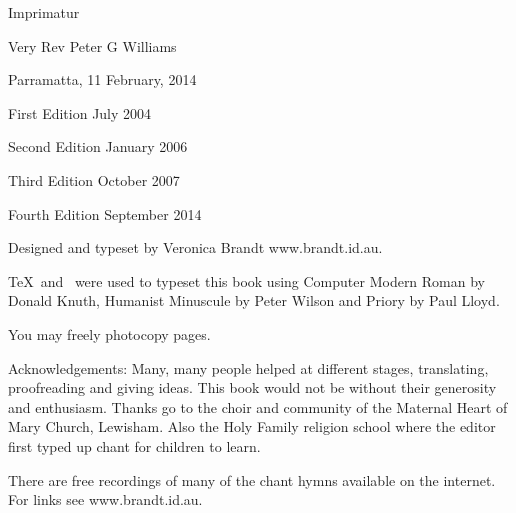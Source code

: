 {\raggedright
{}

\parindent=0mm
\parskip=6pt

Imprimatur
\centerline{Very Rev Peter G Williams}
\rmlyrics

Parramatta, 11 February, 2014

\vfill

First Edition July 2004

Second Edition January 2006

Third Edition October 2007


Fourth Edition September 2014

Designed and typeset by Veronica Brandt www.brandt.id.au.

\TeX\ and \OpusTeX\ were used to typeset this book using
          Computer Modern Roman by Donald Knuth,
          Humanist Minuscule by Peter Wilson
          and Priory by Paul Lloyd.



You may freely photocopy pages.



Acknowledgements:  Many, many people helped at different stages,
translating, proofreading and giving ideas.  This book would not
be without their generosity and enthusiasm.
Thanks go to the choir and community of the Maternal Heart of Mary
Church, Lewisham.  Also the Holy Family 
religion school where the editor first typed up chant for children
to learn. 

There are free recordings of many of the chant hymns available
on the internet.  For links see www.brandt.id.au.



}

